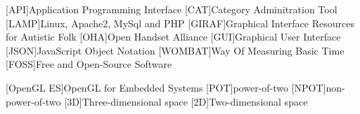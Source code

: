 [API]{Application Programming Interface}
[CAT]{Category Adminitration Tool}
[LAMP]{Linux, Apache2, MySql and PHP}
[GIRAF]{Graphical Interface Resources for Autistic Folk}
[OHA]{Open Handset Alliance}
[GUI]{Graphical User Interface}
[JSON]{JavaScript Object Notation}
[WOMBAT]{Way Of Measuring Basic Time}
[FOSS]{Free and Open-Source Software}

[OpenGL ES]{OpenGL for Embedded Systems}
[POT]{power-of-two}
[NPOT]{non-power-of-two}
[3D]{Three-dimensional space}
[2D]{Two-dimensional space}
